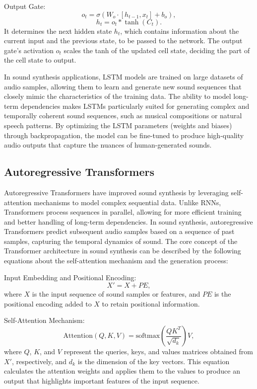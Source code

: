 \documentclass[11pt,a4paper,oneside]{report}
\begin{document}
Output Gate:
\begin{equation}
o_t = \sigma(W_{o} \cdot [h_{t-1}, x_t] + b_o),
\end{equation}
\begin{equation}
h_t = o_t \ast \tanh(C_t).
\end{equation}
It determines the next hidden state $h_t$, which contains information about the current input and the previous state, to be passed to the network. The output gate's activation $o_t$ scales the tanh of the updated cell state, deciding the part of the cell state to output.

In sound synthesis applications, LSTM models are trained on large datasets of audio samples, allowing them to learn and generate new sound sequences that closely mimic the characteristics of the training data. The ability to model long-term dependencies makes LSTMs particularly suited for generating complex and temporally coherent sound sequences, such as musical compositions or natural speech patterns. By optimizing the LSTM parameters (weights and biases) through backpropagation, the model can be fine-tuned to produce high-quality audio outputs that capture the nuances of human-generated sounds.

\subsection{Autoregressive Transformers}

Autoregressive Transformers \cite{yan2021videogpt, wu2022nuwa} have improved sound synthesis by leveraging self-attention mechanisms to model complex sequential data. Unlike RNNs, Transformers process sequences in parallel, allowing for more efficient training and better handling of long-term dependencies. 
In sound synthesis, autoregressive Transformers predict subsequent audio samples based on a sequence of past samples, capturing the temporal dynamics of sound.
The core concept of the Transformer architecture in sound synthesis can be described by the following equations about the self-attention mechanism and the generation process:

Input Embedding and Positional Encoding:
\begin{equation}
X' = X + PE,
\end{equation}
where $X$ is the input sequence of sound samples or features, and $PE$ is the positional encoding added to $X$ to retain positional information.

Self-Attention Mechanism:
\begin{equation}
\text{Attention}(Q, K, V) = \text{softmax}\left(\frac{QK^T}{\sqrt{d_k}}\right)V,
\end{equation}
where $Q$, $K$, and $V$ represent the queries, keys, and values matrices obtained from $X'$, respectively, and $d_k$ is the dimension of the key vectors. This equation calculates the attention weights and applies them to the values to produce an output that highlights important features of the input sequence.
\end{document}
